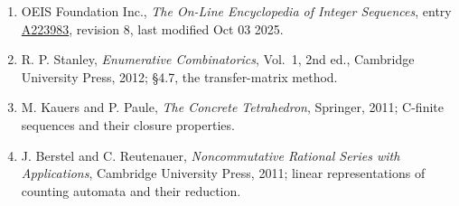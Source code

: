 \documentclass[11pt]{article}
\theoremstyle{definition}
\begin{document}
\begin{enumerate}

\item OEIS Foundation Inc., \emph{The On-Line Encyclopedia of Integer Sequences}, entry \href{https://oeis.org/A223983}{A223983}, revision 8, last modified Oct 03 2025.

\item R. P. Stanley, \emph{Enumerative Combinatorics}, Vol.~1, 2nd ed., Cambridge University Press, 2012; \S4.7, the transfer-matrix method.

\item M. Kauers and P. Paule, \emph{The Concrete Tetrahedron}, Springer, 2011; C-finite sequences and their closure properties.

\item J. Berstel and C. Reutenauer, \emph{Noncommutative Rational Series with Applications}, Cambridge University Press, 2011; linear representations of counting automata and their reduction.

\end{enumerate}
\end{document}
